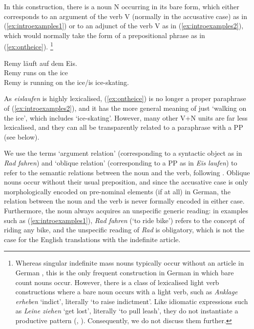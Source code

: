 \documentclass[biblatex, charis, linguex]{glossa}\usepackage{knitr}
\begin{document}
In this construction, there is a noun N occurring in its bare form, which either corresponds to an argument of the verb V (normally in the accusative case) as in (\ref{ex:introexamples1}) or to an adjunct of the verb V as in (\ref{ex:introexamples2}), which would normally take the form of a prepositional phrase as in (\ref{ex:ontheice}).%
\footnote{Whereas singular indefinite mass nouns typically occur without an article in German \citep[471]{Vogel2000}, this is the only frequent construction in German in which bare count nouns occur.
However, there is a class of lexicalised light verb constructions where a bare noun occurs with a light verb, such as \textit{Anklage erheben} `indict', literally `to raise indictment'.
Like idiomatic expressions such as \textit{Leine ziehen} `get lost', literally `to pull leash', they do not instantiate a productive pattern (\citealt[76]{HentschelWeydt2003}, \citealt[198]{Stumpf2015}).
Consequently, we do not discuss them further.}

\begin{exe}
  \ex\gll Remy läuft auf dem Eis.\\
    Remy runs on the ice\\
    \trans Remy is running on the ice\slash is ice-skating.\label{ex:ontheice}
\end{exe}

As \textit{eislaufen} is highly lexicalised, (\ref{ex:ontheice}) is no longer a proper paraphrase of (\ref{ex:introexamples2}), and it has the more general meaning of just `walking on the ice', which includes `ice-skating'.
However, many other V+N units are far less lexicalised, and they can all be transparently related to a paraphrase with a PP (see below).

We use the terms `argument relation' (corresponding to a syntactic object as in \textit{Rad fahren}) and `oblique relation' (corresponding to a PP as in \textit{Eis laufen}) to refer to the semantic relations between the noun and the verb, following \citet[20]{GaetaZeldes2017}.
Oblique nouns occur without their usual preposition, and since the accusative case is only morphologically encoded on pre-nominal elements (if at all) in German, the relation between the noun and the verb is never formally encoded in either case.
Furthermore, the noun always acquires an unspecific generic reading:
in examples such as (\ref{ex:introexamples1}), \textit{Rad fahren} (`to ride bike') refers to the concept of riding any bike, and the unspecific reading of \textit{Rad} is obligatory, which is not the case for the English translations with the indefinite article.
\end{document}
